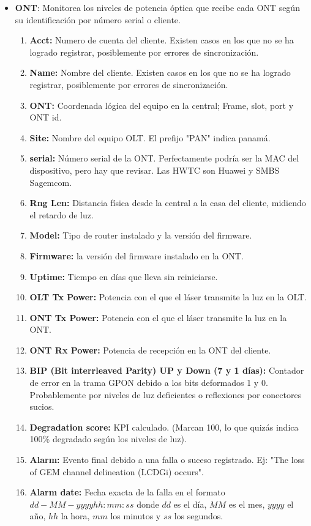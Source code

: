 \documentclass[12pt,a4paper]{article}
\begin{document}
\begin{itemize}
    \item \textbf{ONT}: Monitorea los niveles de potencia óptica que recibe cada ONT según su identificación por número serial o cliente.
    \begin{enumerate}
        \item \textbf{Acct:} Numero de cuenta del cliente. Existen casos en los que no se ha logrado registrar, posiblemente por errores de sincronización. 
        \item \textbf{Name:} Nombre del cliente. Existen casos en los que no se ha logrado registrar, posiblemente por errores de sincronización. 
        \item \textbf{ONT:} Coordenada lógica del equipo en la central; Frame, slot, port y ONT id.
        \item \textbf{Site:} Nombre del equipo OLT. El prefijo "PAN" indica panamá. 
        \item \textbf{serial:} Número serial de la ONT. Perfectamente podría ser la MAC del dispositivo, pero hay que revisar. Las HWTC son Huawei y SMBS Sagemcom.
        \item \textbf{Rng Len:} Distancia física desde la central a la casa del cliente, midiendo el retardo de luz.
        \item \textbf{Model:} Tipo de router instalado y la versión del firmware.
        \item \textbf{Firmware:} la versión del firmware instalado en la ONT.
        \item \textbf{Uptime:} Tiempo en días que lleva sin reiniciarse.
        \item \textbf{OLT Tx Power:} Potencia con el que el láser transmite la luz en la OLT.
        \item \textbf{ONT Tx Power:}  Potencia con el que el láser transmite la luz en la ONT.
        \item \textbf{ONT Rx Power:}  Potencia de recepción en la ONT del cliente.
        \item \textbf{BIP (Bit interrleaved Parity) UP y Down (7 y 1 días):} Contador de error en la trama GPON debido a los bits deformados 1 y 0. Probablemente por niveles de luz deficientes o reflexiones por conectores sucios.
        \item \textbf{Degradation score:} KPI calculado. (Marcan 100, lo que quizás indica 100\% degradado según los niveles de luz). %
        \item \textbf{Alarm:} Evento final debido a una falla o suceso registrado. Ej: "The loss of GEM channel delineation (LCDGi) occurs".
        \item \textbf{Alarm date:} Fecha exacta de la falla en el formato $dd-MM-yyyy hh:mm:ss$ donde $dd$ es el día, $MM$ es el mes, $yyyy$ el año, $hh$ la hora, $mm$ los minutos y $ss$ los segundos.
    \end{enumerate}


\end{itemize}
\end{document}
